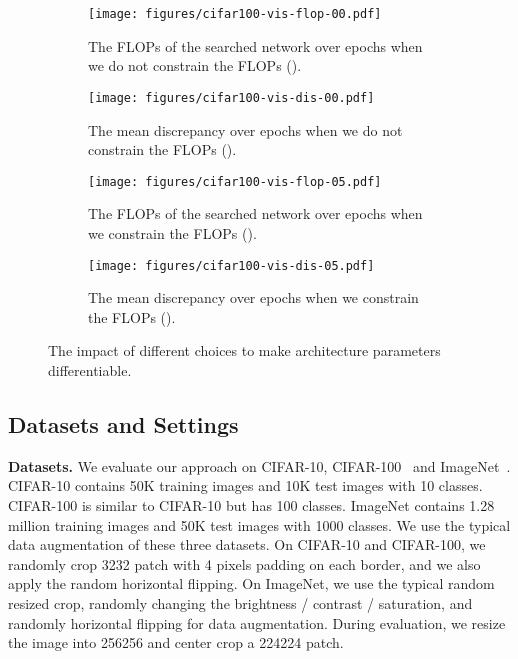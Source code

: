 \documentclass{article}
\begin{document}
\begin{figure}
     \centering
     \begin{subfigure}[t]{0.47\textwidth}
         \centering
         \texttt{[image: figures/cifar100-vis-flop-00.pdf]}
         \caption{The FLOPs of the searched network over epochs when we do not constrain the FLOPs ().}
         \label{fig:ablation-wrt-flop-00}
     \end{subfigure}
     \hfill
     \begin{subfigure}[t]{0.47\textwidth}
         \centering
         \texttt{[image: figures/cifar100-vis-dis-00.pdf]}
         \caption{The mean discrepancy over epochs when we do not constrain the FLOPs ().}
         \label{fig:ablation-wrt-dis-00}
     \end{subfigure}
     \begin{subfigure}[t]{0.47\textwidth}
         \centering
         \texttt{[image: figures/cifar100-vis-flop-05.pdf]}
         \caption{The FLOPs of the searched network over epochs when we constrain the FLOPs ().}
         \label{fig:ablation-wrt-flop-05}
     \end{subfigure}
     \hfill
     \begin{subfigure}[t]{0.47\textwidth}
         \centering
         \texttt{[image: figures/cifar100-vis-dis-05.pdf]}
         \caption{The mean discrepancy over epochs when we constrain the FLOPs ().}
         \label{fig:ablation-wrt-dis-05}
     \end{subfigure}
        \caption{
        The impact of different choices to make architecture parameters differentiable.
        }
        \label{fig:ablation-4-cases}
\end{figure}



\subsection{Datasets and Settings}\label{sec:exp-data-set}

\textbf{Datasets.} We evaluate our approach on CIFAR-10, CIFAR-100~\cite{krizhevsky2009learning} and ImageNet~\cite{deng2009imagenet}. CIFAR-10 contains 50K training images and 10K test images with 10 classes. CIFAR-100 is similar to CIFAR-10 but has 100 classes. ImageNet contains 1.28 million training images and 50K test images with 1000 classes. We use the typical data augmentation of these three datasets.
On CIFAR-10 and CIFAR-100, we randomly crop 3232 patch with 4 pixels padding on each border, and we also apply the random horizontal flipping.
On ImageNet, we use the typical random resized crop, randomly changing the brightness / contrast / saturation, and randomly horizontal flipping for data augmentation.
During evaluation, we resize the image into 256256 and center crop a 224224 patch.
\end{document}
